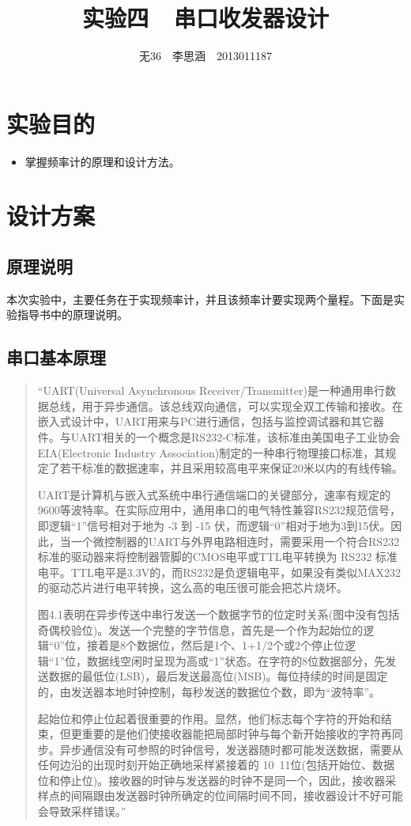 \documentclass[11pt,a4paper]{article}
\begin{document}
\title{实验四\ \ 串口收发器设计}
\author{无36$\quad$李思涵$\quad$2013011187}
\maketitle

\section{实验目的}
\begin{itemize}
  \item 掌握频率计的原理和设计方法。
\end{itemize}

\section{设计方案}
\subsection{原理说明}
本次实验中，主要任务在于实现频率计，并且该频率计要实现两个量程。下面是实验指导书中的原理说明。

\subsection{串口基本原理}
\begin{quotation}
  “UART(Universal Asynchronous Receiver/Transmitter)是一种通用串行数据总线，用于异步通信。该总线双向通信，可以实现全双工传输和接收。在嵌入式设计中，UART用来与PC进行通信，包括与监控调试器和其它器件。与UART相关的一个概念是RS232-C标准，该标准由美国电子工业协会EIA(Electronic Industry Association)制定的一种串行物理接口标准，其规定了若干标准的数据速率，并且采用较高电平来保证20米以内的有线传输。

  UART是计算机与嵌入式系统中串行通信端口的关键部分，速率有规定的9600等波特率。在实际应用中，通用串口的电气特性兼容RS232规范信号，即逻辑“1”信号相对于地为 -3 到 -15 伏，而逻辑“0”相对于地为3到15伏。因此，当一个微控制器的UART与外界电路相连时，需要采用一个符合RS232标准的驱动器来将控制器管脚的CMOS电平或TTL电平转换为 RS232 标准电平。TTL电平是3.3V的，而RS232是负逻辑电平，如果没有类似MAX232的驱动芯片进行电平转换，这么高的电压很可能会把芯片烧坏。

  图4.1表明在异步传送中串行发送一个数据字节的位定时关系(图中没有包括奇偶校验位)。发送一个完整的字节信息，首先是一个作为起始位的逻辑“0”位，接着是8个数据位，然后是1个、1+1/2个或2个停止位逻辑“1”位，数据线空闲时呈现为高或“1”状态。在字符的8位数据部分，先发送数据的最低位(LSB)，最后发送最高位(MSB)。每位持续的时间是固定的，由发送器本地时钟控制，每秒发送的数据位个数，即为“波特率”。

  起始位和停止位起着很重要的作用。显然，他们标志每个字符的开始和结束，但更重要的是他们使接收器能把局部时钟与每个新开始接收的字符再同步。异步通信没有可参照的时钟信号，发送器随时都可能发送数据，需要从任何边沿的出现时刻开始正确地采样紧接着的 10~11位(包括开始位、数据位和停止位)。接收器的时钟与发送器的时钟不是同一个，因此，接收器采样点的间隔跟由发送器时钟所确定的位间隔时间不同，接收器设计不好可能会导致采样错误。”
\end{quotation}
\end{document}
